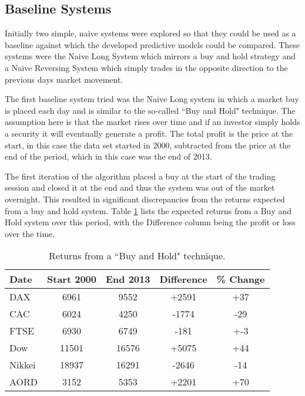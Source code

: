 %

%

\subsection{Baseline Systems}
Initially two simple, naive systems were explored so that they could be used as a baseline against which the developed predictive models could be compared. These systems were the Naive Long System which mirrors a buy and hold strategy and a Naive Reversing System which simply trades in the opposite direction to the previous days market movement.

The first baseline system tried was the Naive Long system in which a market buy is placed each day and is similar to the so-called \textquotedblleft Buy and Hold" technique. The assumption here is that the market rises over time and if an investor simply holds a security it will eventually generate a profit.  The total profit is the price at the start, in this case the data set started in 2000, subtracted from the price at the end of the period, which in this case was the end of 2013.

The first iteration of the algorithm placed a buy at the start of the trading session and closed it at the end and thus the system was out of the market overnight. This resulted in significant discrepancies from the returns expected from a buy and hold system. Table \ref{tab:ind_start_stop_chp6} lists the expected returns from a Buy and Hold system over this period, with the Difference column being the profit or loss over the time.

\begin{table}[!htbp] \centering  
\caption[Returns from a  \textquotedblleft Buy and Hold" technique]{Returns from a  \textquotedblleft Buy and Hold" technique.}
\label{tab:ind_start_stop_chp6}
\begin{tabular}{lcccc}
\toprule
Date & Start 2000 & End 2013 & Difference & \% Change  \\
\midrule
DAX & 6961 & 9552   & +2591 & +37 \\
CAC & 6024 & 4250   & -1774 & -29 \\
FTSE & 6930 & 6749  & -181  & +-3 \\
Dow & 11501 & 16576 & +5075 & +44 \\
Nikkei & 18937 & 16291 & -2646 & -14 \\
AORD & 3152 & 5353  & +2201 & +70 \\
\bottomrule
\end{tabular}
\end{table}

